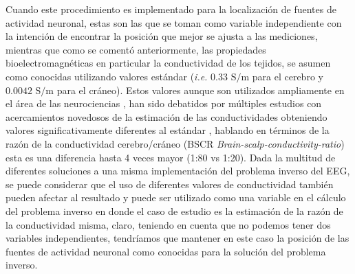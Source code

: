 Cuando este procedimiento es implementado para la localización de fuentes de actividad neuronal, estas son las que se toman como variable independiente con la intención de encontrar la posición que mejor se ajusta a las mediciones, mientras que como se comentó anteriormente, las propiedades bioelectromagnéticas en particular la conductividad de los tejidos, se asumen como conocidas utilizando valores estándar (\emph{i.e.} $0.33\text{ S/m}$ para el cerebro y $0.0042 \text{ S/m}$ para el cráneo). Estos valores aunque son utilizados ampliamente en el área de las neurociencias \cite{Rush1968,Rush1969,Cohen1983}, han sido debatidos por múltiples estudios con acercamientos novedosos de la estimación de las conductividades obteniendo valores significativamente diferentes al estándar \cite{McCann2019}, hablando en términos de la razón de la conductividad cerebro/cráneo (BSCR \emph{Brain-scalp-conductivity-ratio}) esta es una diferencia hasta 4 veces mayor (1:80 vs 1:20). Dada la multitud de diferentes soluciones a una misma implementación del problema inverso del EEG, se puede considerar que el uso de diferentes valores de conductividad también pueden afectar al resultado y puede ser utilizado como una variable en el cálculo del problema inverso en donde el caso de estudio es la estimación de la razón de la conductividad misma, claro, teniendo en cuenta que no podemos tener dos variables independientes, tendríamos que mantener en este caso la posición de las fuentes de actividad neuronal como conocidas para la solución del problema inverso. 


